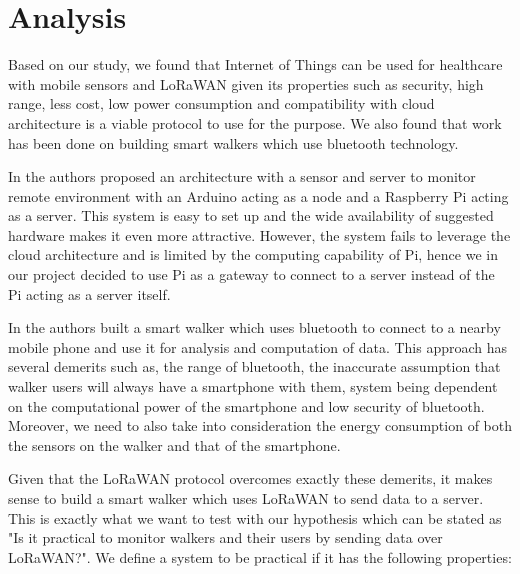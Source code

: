 \chapter{Analysis}
\label{cha:analysis}

Based on our study, we found that Internet of Things can be used for healthcare with mobile sensors and LoRaWAN given its properties such as  security, high range, less cost, low power consumption and compatibility with cloud architecture is a viable protocol to use for the purpose. We also found that work has been done on building smart walkers which use bluetooth technology.

In \cite{erdoush2014wireless} the authors proposed an architecture with a sensor and server to monitor remote environment with an Arduino acting as a node and a Raspberry Pi acting as a server. This system is easy to set up and the wide availability of suggested hardware makes it even more attractive. However, the system fails to leverage the cloud architecture and is limited by the computing capability of Pi, hence we in our project decided to use Pi as a gateway to connect to a server instead of the Pi acting as a server itself.


In \cite{postolache2011smart} the authors built a smart walker which uses bluetooth to connect to a nearby mobile phone and use it for analysis and computation of data. This approach has several demerits such as, the range of bluetooth, the inaccurate assumption that walker users will always have a smartphone with them, system being dependent on the computational power of the smartphone and low security of bluetooth. Moreover, we need to also take into consideration the energy consumption of both the sensors on the walker and that of the smartphone.

Given that the LoRaWAN protocol overcomes exactly these demerits, it makes sense to build a smart walker which uses LoRaWAN to send data to a server.
This is exactly what we want to test with our hypothesis which can be stated as "Is it practical to monitor walkers and their users by sending data over LoRaWAN?". We define a system to be practical if it has the following properties:

